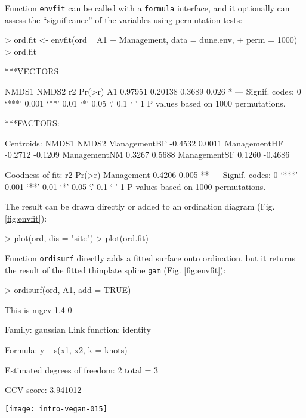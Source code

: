 \documentclass[a4paper,10pt]{amsart}
\begin{document}
Function \texttt{envfit} can be called with a \texttt{formula}
interface, and it optionally can assess the ``significance'' of the
variables using permutation tests:
\begin{Schunk}
\begin{Sinput}
> ord.fit <- envfit(ord ~ A1 + Management, data = dune.env, 
+     perm = 1000)
> ord.fit
\end{Sinput}
\begin{Soutput}
***VECTORS

     NMDS1   NMDS2     r2 Pr(>r)  
A1 0.97951 0.20138 0.3689  0.026 *
---
Signif. codes:  0 ‘***’ 0.001 ‘**’ 0.01 ‘*’ 0.05 ‘.’ 0.1 ‘ ’ 1 
P values based on 1000 permutations.

***FACTORS:

Centroids:
               NMDS1   NMDS2
ManagementBF -0.4532  0.0011
ManagementHF -0.2712 -0.1209
ManagementNM  0.3267  0.5688
ManagementSF  0.1260 -0.4686

Goodness of fit:
               r2 Pr(>r)   
Management 0.4206  0.005 **
---
Signif. codes:  0 ‘***’ 0.001 ‘**’ 0.01 ‘*’ 0.05 ‘.’ 0.1 ‘ ’ 1 
P values based on 1000 permutations.
\end{Soutput}
\end{Schunk}
The result can be drawn directly or added to an ordination diagram
(Fig. \ref{fig:envfit}):
\begin{Schunk}
\begin{Sinput}
> plot(ord, dis = "site")
> plot(ord.fit)
\end{Sinput}
\end{Schunk}

Function \texttt{ordisurf} directly adds a fitted surface onto
ordination, but it returns the result of the fitted thinplate spline
\texttt{gam} (Fig. \ref{fig:envfit}):
\begin{Schunk}
\begin{Sinput}
> ordisurf(ord, A1, add = TRUE)
\end{Sinput}
\begin{Soutput}
This is mgcv 1.4-0 

Family: gaussian 
Link function: identity 

Formula:
y ~ s(x1, x2, k = knots)

Estimated degrees of freedom:
 2   total =  3 

GCV score:  3.941012 
\end{Soutput}
\end{Schunk}
\begin{SCfigure}
\texttt{[image: intro-vegan-015]}
\caption{Fitted vector and smooth surface for the thickness of A1
  horizon (\texttt{A1}, in cm), and centroids of Management levels.}
\label{fig:envfit}
\end{SCfigure}
\end{document}
